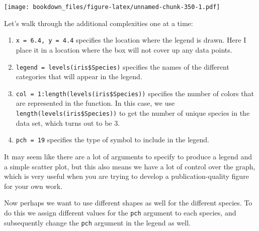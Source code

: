 \documentclass[
]{krantz}
\makeatletter
\newenvironment{Shaded}{\begin{snugshade}}{\end{snugshade}}
\newcommand{\DataTypeTok}[1]{\textcolor[rgb]{0.27,0.27,0.27}{#1}}
\newcommand{\DecValTok}[1]{\textcolor[rgb]{0.06,0.06,0.06}{#1}}
\newcommand{\FloatTok}[1]{\textcolor[rgb]{0.06,0.06,0.06}{#1}}
\newcommand{\KeywordTok}[1]{\textcolor[rgb]{0.27,0.27,0.27}{\textbf{#1}}}
\newcommand{\NormalTok}[1]{#1}
\newcommand{\OperatorTok}[1]{\textcolor[rgb]{0.43,0.43,0.43}{\textbf{#1}}}
\providecommand{\tightlist}{%
  \setlength{\itemsep}{0pt}\setlength{\parskip}{0pt}}
\newenvironment{kframe}{%
\medskip{}
\setlength{\fboxsep}{.8em}
 \def\at@end@of@kframe{}%
 \ifinner\ifhmode%
  \def\at@end@of@kframe{\end{minipage}}%
  \begin{minipage}{\columnwidth}%
 \fi\fi%
 \def\FrameCommand##1{\hskip\@totalleftmargin \hskip-\fboxsep
 \colorbox{shadecolor}{##1}\hskip-\fboxsep
     \hskip-\linewidth \hskip-\@totalleftmargin \hskip\columnwidth}%
 \MakeFramed {\advance\hsize-\width
   \@totalleftmargin\z@ \linewidth\hsize
   \@setminipage}}%
 {\par\unskip\endMakeFramed%
 \at@end@of@kframe}
\renewenvironment{Shaded}{\begin{kframe}}{\end{kframe}}
\makeatother
\begin{document}
\texttt{[image: bookdown\_files/figure-latex/unnamed-chunk-350-1.pdf]}

Let's walk through the additional complexities one at a time:

\begin{enumerate}
\def\labelenumi{\arabic{enumi}.}
\tightlist
\item
  \texttt{x\ =\ 6.4,\ y\ =\ 4.4} specifies the location where the legend is drawn. Here I place it in a location where the box will not cover up any data points.
\item
  \texttt{legend\ =\ levels(iris\$Species)} specifies the names of the different categories that will appear in the legend.
\item
  \texttt{col\ =\ 1:length(levels(iris\$Species))} specifies the number of colors that are represented in the function. In this case, we use \texttt{length(levels(iris\$Species))} to get the number of unique species in the data set, which turns out to be 3.
\item
  \texttt{pch\ =\ 19} specifies the type of symbol to include in the legend.
\end{enumerate}

It may seem like there are a lot of arguments to specify to produce a legend and a simple scatter plot, but this also means we have a lot of control over the graph, which is very useful when you are trying to develop a publication-quality figure for your own work.

Now perhaps we want to use different shapes as well for the different species. To do this we assign different values for the \texttt{pch} argument to each species, and subsequently change the \texttt{pch} argument in the legend as well.

\begin{Shaded}
\end{Shaded}
\end{document}
